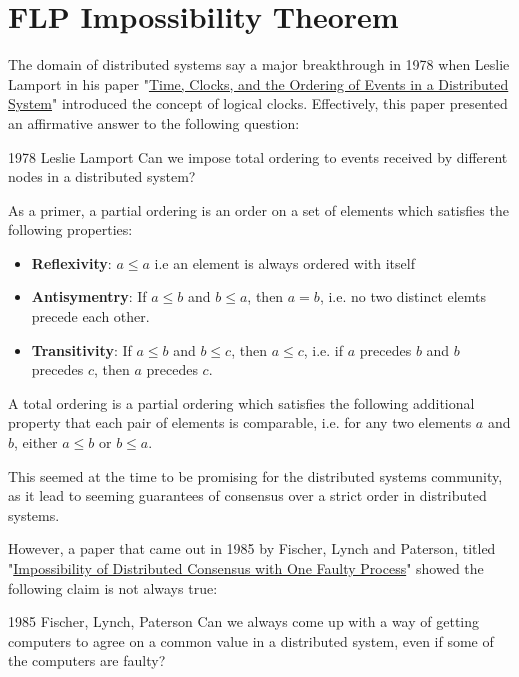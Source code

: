 \section{FLP Impossibility Theorem}

The domain of distributed systems say a major breakthrough in 1978 when Leslie Lamport in his paper "\href{https://amturing.acm.org/p558-lamport.pdf}{Time, Clocks, and the Ordering of Events in a Distributed System}" introduced the concept of logical clocks. Effectively, this paper presented an affirmative answer to the following question:

\begin{quotebox}{1978 Leslie Lamport}
    Can we impose total ordering to events received by different nodes in a distributed system?
\end{quotebox}

As a primer, a partial ordering is an order on a set of elements which satisfies the following properties:
\begin{itemize}
    \item \textbf{Reflexivity}: $a \leq a$ i.e an element is always ordered with itself
    \item \textbf{Antisymentry}: If $a \leq b$ and $b \leq a$, then $a = b$, i.e. no two distinct elemts precede each other.
    \item \textbf{Transitivity}: If $a \leq b$ and $b \leq c$, then $a \leq c$, i.e. if $a$ precedes $b$ and $b$ precedes $c$, then $a$ precedes $c$.
\end{itemize}

A total ordering is a partial ordering which satisfies the following additional property that each pair of elements is comparable, i.e. for any two elements $a$ and $b$, either $a \leq b$ or $b \leq a$.

This seemed at the time to be promising for the distributed systems community, as it lead to seeming guarantees of consensus over a strict order in distributed systems. 

However, a paper that came out in 1985 by Fischer, Lynch and Paterson, titled "\href{https://groups.csail.mit.edu/tds/papers/Lynch/jacm85.pdf}{Impossibility of Distributed Consensus with One Faulty Process}" showed the following claim is not always true: 

\begin{quotebox}{1985 Fischer, Lynch, Paterson}
    Can we always come up with a way of getting computers to agree on a common value in a distributed system, even if some of the computers are faulty?
\end{quotebox}

